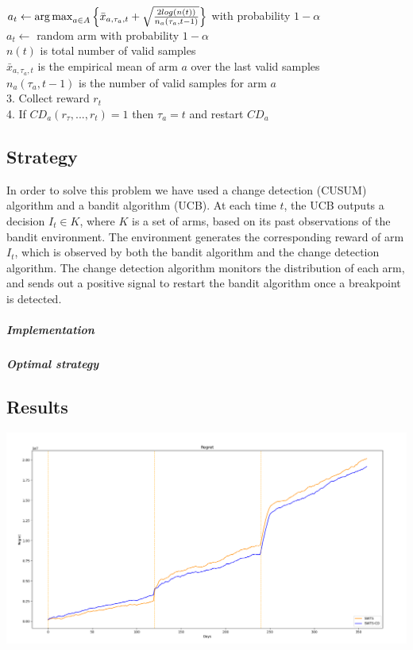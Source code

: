 \hspace{0.8cm} $a_{t} \leftarrow \operatorname{arg\,max}_{a \in A}{\left\{\bar{x}_{a,\tau_{a},t} + \sqrt{\frac{2 log(n(t))}{{n_{a}(\tau_{a},t-1)}} }\right\}}$ with probability $1-\alpha$\\

\hspace{0.8cm} $a_{t} \leftarrow$ random arm with probability $1-\alpha$ \\

$n(t)$	is total number of valid samples\\

$\bar{x}_{a,\tau_{a},t}$ is the empirical mean of arm $a$ over the last valid samples\\

$n_{a}(\tau_{a},t-1)$ is the number of valid samples for arm $a$\\

3. Collect reward $r_t$\\

4. If $CD_a (r_{\tau},...,r_t) = 1$ then $\tau_a = t$ and restart $CD_a$


\subsection*{Strategy}
In order to solve this problem we have used a change detection (CUSUM) algorithm and a bandit algorithm (UCB). At each time $t$, the UCB outputs a decision $I_t \in K$, where $K$ is a set of arms, based on its past observations of the bandit environment. The environment generates the corresponding reward of arm $I_t$, which is observed by both the bandit algorithm and the change detection algorithm. The change detection algorithm monitors the distribution of each arm, and sends out a positive signal to restart the bandit algorithm once a breakpoint is detected.

\subparagraph{Implementation} 
\subparagraph{Optimal strategy}




\subsection*{Results}
\begin{center}
	\includegraphics[scale=0.35]{Images/n8}
\end{center}
